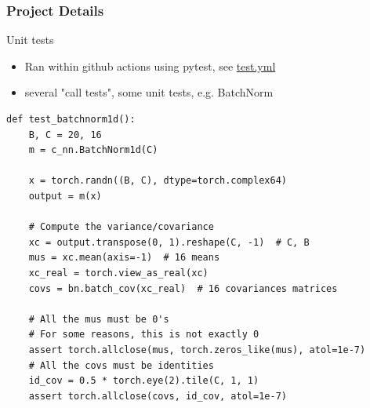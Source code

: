 \documentclass[aspectratio=169,10pt]{beamer}
\begin{document}
\begin{frame}[fragile]
\frametitle{Project Details}

\begin{block}{Unit tests}

\begin{itemize}
\item Ran within github actions using pytest, see \href{https://github.com/jeremyfix/torchcvnn/blob/main/.github/workflows/test.yml}{test.yml}
\item several "call tests", some unit tests, e.g. BatchNorm
\end{itemize}
\scriptsize
\begin{verbatim}
def test_batchnorm1d():
    B, C = 20, 16
    m = c_nn.BatchNorm1d(C)

    x = torch.randn((B, C), dtype=torch.complex64)
    output = m(x)

    # Compute the variance/covariance
    xc = output.transpose(0, 1).reshape(C, -1)  # C, B
    mus = xc.mean(axis=-1)  # 16 means
    xc_real = torch.view_as_real(xc)
    covs = bn.batch_cov(xc_real)  # 16 covariances matrices

    # All the mus must be 0's
    # For some reasons, this is not exactly 0
    assert torch.allclose(mus, torch.zeros_like(mus), atol=1e-7)
    # All the covs must be identities
    id_cov = 0.5 * torch.eye(2).tile(C, 1, 1)
    assert torch.allclose(covs, id_cov, atol=1e-7)
\end{verbatim}
\normalsize 


\end{block}

\end{frame}
\end{document}
